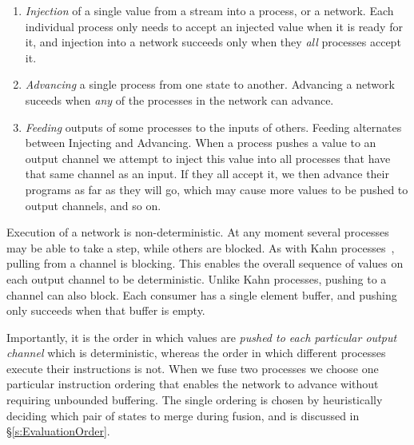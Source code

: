 \begin{enumerate}
\item \emph{Injection} of a single value from a stream into a process, or a network. Each individual process only needs to accept an injected  value when it is ready for it, and injection into a network succeeds only when they \emph{all} processes accept it.

\item \emph{Advancing} a single process from one state to another. Advancing a network suceeds when \emph{any} of the processes in the network can advance.

\item \emph{Feeding} outputs of some processes to the inputs of others. Feeding alternates between Injecting and Advancing. When a process pushes a value to an output channel we attempt to inject this value into all processes that have that same channel as an input. If they all accept it, we then advance their programs as far as they will go, which may cause more values to be pushed to output channels, and so on.
\end{enumerate}

Execution of a network is non-deterministic. At any moment several processes may be able to take a step, while others are blocked. As with Kahn processes~\cite{kahn1976coroutines}, pulling from a channel is blocking. This enables the overall sequence of values on each output channel to be deterministic. Unlike Kahn processes, pushing to a channel can also block. Each consumer has a single element buffer, and pushing only succeeds when that buffer is empty.


Importantly, it is the order in which values are \emph{pushed to each particular output channel} which is deterministic, whereas the order in which different processes execute their instructions is not. When we fuse two processes we choose one particular instruction ordering that enables the network to advance without requiring unbounded buffering. The single ordering is chosen by heuristically deciding which pair of states to merge during fusion, and is discussed in \S\ref{s:EvaluationOrder}.

